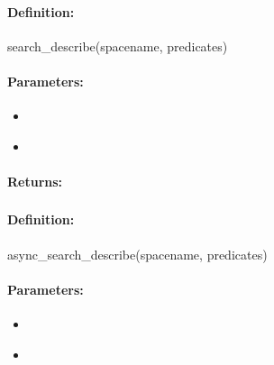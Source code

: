 \paragraph{Definition:}
\begin{rubycode}
search_describe(spacename, predicates)
\end{rubycode}

\paragraph{Parameters:}
\begin{itemize}[noitemsep]
\item {}\\

\item {}\\

\end{itemize}

\paragraph{Returns:}


\pagebreak
\subsubsection{}
\label{api:ruby:async_search_describe}


\paragraph{Definition:}
\begin{rubycode}
async_search_describe(spacename, predicates)
\end{rubycode}

\paragraph{Parameters:}
\begin{itemize}[noitemsep]
\item {}\\

\item {}\\

\end{itemize}

